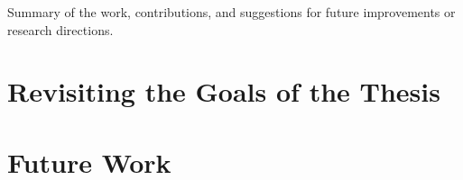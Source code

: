 
Summary of the work, contributions, and suggestions for future improvements or research directions.

\section{Revisiting the Goals of the Thesis}

\section{Future Work}